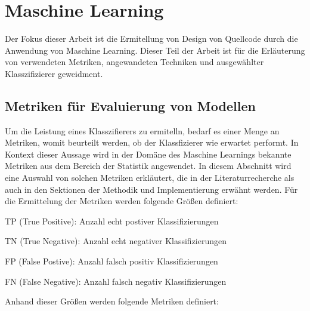 \section{Maschine Learning}

Der Fokus dieser Arbeit ist die Ermitellung von Design von Quellcode durch die Anwendung von Maschine Learning.
Dieser Teil der Arbeit ist für die Erläuterung von verwendeten Metriken, angewandeten Techniken und ausgewählter Klasszifizierer geweidment.

\subsection{Metriken für Evaluierung von Modellen}

Um die Leistung eines Klasszifierers zu ermitelln, bedarf es einer Menge an Metriken, womit beurteilt werden, ob der Klassfizierer wie erwartet performt.
In Kontext dieser Aussage wird in der Domäne des Maschine Learnings bekannte Metriken aus dem Bereich der Statistik angewendet.
In diesem Abschnitt wird eine Auswahl von solchen Metriken erkläutert, die in der Literaturrecherche als auch in den Sektionen der Methodik und Implementierung erwähnt werden.
Für die Ermittelung der Metriken werden folgende Größen definiert:

\begin{description}
    \item TP (True Positive): Anzahl echt postiver Klassifizierungen
    \item TN (True Negative): Anzahl echt negativer Klassifizierungen
    \item FP (False Postive): Anzahl falsch positiv Klassifizierungen
    \item FN (False Negative): Anzahl falsch negativ Klassifizierungen
\end{description}

Anhand dieser Größen werden folgende Metriken definiert:

